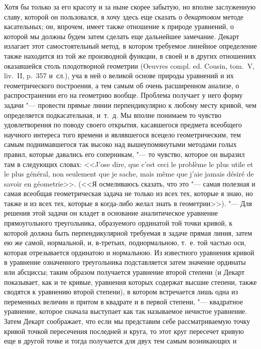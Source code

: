 Хотя бы только за его красоту и за ныне скорее забытую, но вполне
заслуженную славу, которой он пользовался, я хочу здесь еще сказать о
{\em декартовом} методе касательных; он, впрочем, имеет
также отношение к природе уравнений, о которой мы должны будем затем
сделать еще дальнейшее замечание. Декарт излагает этот самостоятельный
метод, в котором требуемое линейное определение также находится из той же
производной функции, в своей и в других отношениях оказавшейся столь
плодотворной геометрии (Oeuvres compl. ed. Cousin, tom.~V, liv.~II, p.~357
и~сл.), уча в ней о великой основе природы уравнений и их геометрического
построения, а тем самым об очень расширенном анализе, о распространении его
на геометрию вообще. Проблема получает у него форму задачи "--- провести
прямые линии перпендикулярно к любому месту кривой, чем определяется
подкасательная, и~т.~д. Мы вполне понимаем то чувство удовлетворения по
поводу своего открытия, касавшегося предмета всеобщего научного интереса
того времени и являвшегося всецело геометрическим, тем самым поднимавшегося
так высоко над вышеупомянутыми методами голых правил, которые давались его
соперникам, "--- то чувство, которое он выразил там в следующих словах:
<<J’ose dire, que c’est ceci le problème le plus utile et le plus général,
non seulement que je sache, mais même que j’aie jamais désiré de savoir
en géometrie>>.
(<<Я осмеливаюсь сказать, что это "--- самая полезная и самая всеобщая
геометрическая задача не только из всех тех, которые я знаю, но также и из
всех тех, которые я когда-либо желал знать в геометрии>>). "--- Для решения
этой задачи он кладет в основание аналитическое уравнение прямоугольного
треугольника, образуемого ординатой той точки кривой, к которой должна быть
перпендикулярной требуемая в задаче прямая линия, затем ею же самой,
нормальной, и, в-третьих, поднормальною, т.~е. той частью оси, которая
отрезывается ординатою и нормальною. Из известного уравнения кривой в
уравнение означенного треугольника подставляется затем значение ординаты
или абсциссы; таким образом получается уравнение второй степени (и Декарт
показывает, как и те кривые, уравнения которых содержат высшие степени,
также сводятся к уравнению второй степени), в котором встречается лишь одна
из переменных величин и притом в квадрате и в первой степени, "--- квадратное
уравнение, которое сначала выступает как так называемое нечистое уравнение.
Затем Декарт соображает, что если мы представим себе рассматриваемую точку
кривой точкой пересечения последней и круга, то этот круг пересечет кривую
еще в другой точке и тогда получается для двух тем самым возникающих и
